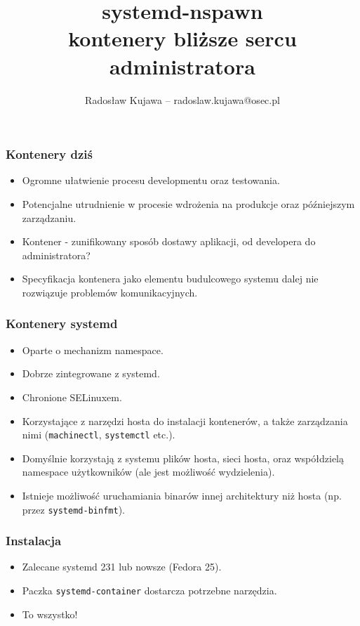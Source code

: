 \documentclass[dvipsnames,table]{beamer}
\title{systemd-nspawn \\ kontenery bliższe sercu administratora}
\author{Radosław Kujawa -- radoslaw.kujawa@osec.pl}
\institute{OSEC}
\begin{document}
\begin{frame}
	\titlepage
\end{frame}



\begin{frame}
\frametitle{Kontenery dziś}
\begin{itemize}
	\item Ogromne ułatwienie procesu developmentu oraz testowania.
	\item Potencjalne utrudnienie w procesie wdrożenia na produkcje oraz późniejszym zarządzaniu.
	\item Kontener - zunifikowany sposób dostawy aplikacji, od developera do administratora?
	\item Specyfikacja kontenera jako elementu budulcowego systemu dalej nie rozwiązuje problemów komunikacyjnych. 
\end{itemize}
\end{frame}

\begin{frame}
\frametitle{Kontenery systemd}
\begin{itemize}
	\item Oparte o mechanizm namespace.
	\item Dobrze zintegrowane z systemd.
	\item Chronione SELinuxem.
	\item Korzystające z narzędzi hosta do instalacji kontenerów, a także zarządzania nimi ({\tt machinectl}, {\tt systemctl} etc.).
	\item Domyślnie korzystają z systemu plików hosta, sieci hosta, oraz współdzielą namespace użytkowników (ale jest możliwość wydzielenia).
	\item Istnieje możliwość uruchamiania binarów innej architektury niż hosta (np. przez {\tt systemd-binfmt}).
\end{itemize}
\end{frame}

\begin{frame}
\frametitle{Instalacja}
\begin{itemize}
	\item Zalecane systemd 231 lub nowsze (Fedora 25).
	\item Paczka {\tt systemd-container} dostarcza potrzebne narzędzia.
	\item To wszystko! \Smiley
\end{itemize}
\end{frame}
\end{document}
